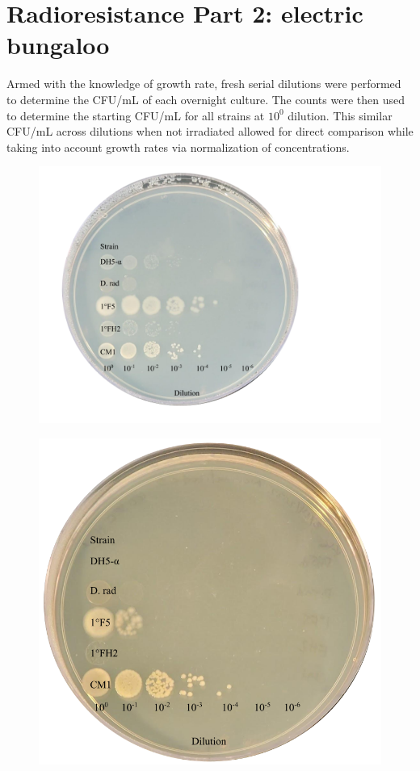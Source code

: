 \documentclass[12pt,twoside]{reedthesis}
\begin{document}
\hypertarget{radioresistance-part-2-electric-bungaloo}{%
\section{Radioresistance Part 2: electric bungaloo}\label{radioresistance-part-2-electric-bungaloo}}

Armed with the knowledge of growth rate, fresh serial dilutions were performed to determine the CFU/mL of each overnight culture. The counts were then used to determine the starting CFU/mL for all strains at \(10^0\) dilution. This similar CFU/mL across dilutions when not irradiated allowed for direct comparison while taking into account growth rates via normalization of concentrations.
\begin{figure}[t]
\centering
\includegraphics[width=\textwidth]{figure/n0secUV.png}
\caption[Normalized UV - 0 seconds]{}
\label{fig:n0secUV}
\end{figure}
\begin{figure}[t]
\centering
\includegraphics[width=\textwidth]{figure/n60secUV.png}
\caption[Normalized UV - 60 seconds]{}
\label{fig:n60secUV}
\end{figure}
\end{document}
